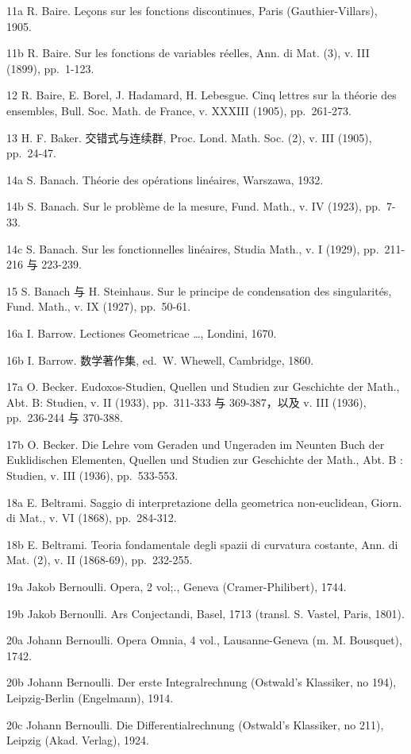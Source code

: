 11a R. Baire. Leçons sur les fonctions discontinues, Paris (Gauthier-Villars), 1905.

11b R. Baire. Sur les fonctions de variables réelles, Ann. di Mat. (3), v. III (1899), pp.~1-123.

12 R. Baire, E. Borel, J. Hadamard, H. Lebesgue. Cinq lettres sur la théorie des ensembles, Bull. Soc. Math. de France, v. XXXIII (1905), pp.~261-273.

13 H. F. Baker. 交错式与连续群, Proc. Lond. Math. Soc. (2), v. III (1905), pp.~24-47.

14a S. Banach. Théorie des opérations linéaires, Warszawa, 1932.

14b S. Banach. Sur le problème de la mesure, Fund. Math., v. IV (1923), pp.~7-33.

14c S. Banach. Sur les fonctionnelles linéaires, Studia Math., v. I (1929), pp.~211-216 与 223-239.

15 S. Banach 与 H. Steinhaus. Sur le principe de condensation des singularités, Fund. Math., v. IX (1927), pp.~50-61.

16a I. Barrow. Lectiones Geometricae \ldots, Londini, 1670.

16b I. Barrow. 数学著作集, ed.~W. Whewell, Cambridge, 1860.

17a O. Becker. Eudoxos-Studien, Quellen und Studien zur Geschichte der Math., Abt. B: Studien, v. II (1933), pp.~311-333 与 369-387，以及 v. III (1936), pp.~236-244 与 370-388.

17b O. Becker. Die Lehre vom Geraden und Ungeraden im Neunten Buch der Euklidischen Elementen, Quellen und Studien zur Geschichte der Math., Abt. B : Studien, v. III (1936), pp.~533-553.

18a E. Beltrami. Saggio di interpretazione della geometrica non-euclidean, Giorn. di Mat., v. VI (1868), pp.~284-312.

18b E. Beltrami. Teoria fondamentale degli spazii di curvatura costante, Ann. di Mat. (2), v. II (1868-69), pp.~232-255.

19a Jakob Bernoulli. Opera, 2 vol;., Geneva (Cramer-Philibert), 1744.

19b Jakob Bernoulli. Ars Conjectandi, Basel, 1713 (transl. S. Vastel, Paris, 1801).

20a Johann Bernoulli. Opera Omnia, 4 vol., Lausanne-Geneva (m. M. Bousquet), 1742.

20b Johann Bernoulli. Der erste Integralrechnung (Ostwald's Klassiker, no 194), Leipzig-Berlin (Engelmann), 1914.

20c Johann Bernoulli. Die Differentialrechnung (Ostwald's Klassiker, no 211), Leipzig (Akad. Verlag), 1924.


